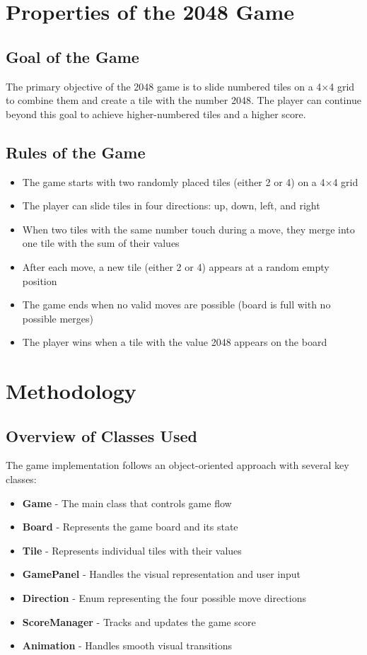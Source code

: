 \documentclass[12pt, a4paper]{article}
\begin{document}
\section{Properties of the 2048 Game}

\subsection{Goal of the Game}
The primary objective of the 2048 game is to slide numbered tiles on a 4×4 grid to combine them and create a tile with the number 2048. The player can continue beyond this goal to achieve higher-numbered tiles and a higher score.

\subsection{Rules of the Game}
\begin{itemize}
    \item The game starts with two randomly placed tiles (either 2 or 4) on a 4×4 grid
    \item The player can slide tiles in four directions: up, down, left, and right
    \item When two tiles with the same number touch during a move, they merge into one tile with the sum of their values
    \item After each move, a new tile (either 2 or 4) appears at a random empty position
    \item The game ends when no valid moves are possible (board is full with no possible merges)
    \item The player wins when a tile with the value 2048 appears on the board
\end{itemize}

\section{Methodology}

\subsection{Overview of Classes Used}
The game implementation follows an object-oriented approach with several key classes:

\begin{itemize}
    \item \textbf{Game} - The main class that controls game flow
    \item \textbf{Board} - Represents the game board and its state
    \item \textbf{Tile} - Represents individual tiles with their values
    \item \textbf{GamePanel} - Handles the visual representation and user input
    \item \textbf{Direction} - Enum representing the four possible move directions
    \item \textbf{ScoreManager} - Tracks and updates the game score
    \item \textbf{Animation} - Handles smooth visual transitions
\end{itemize}
\end{document}

